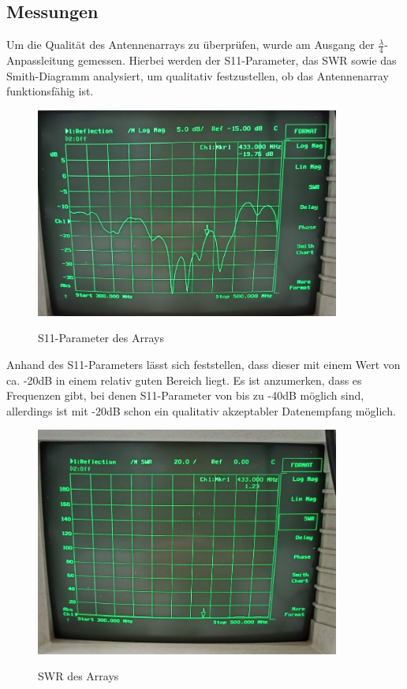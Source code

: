 \subsection{Messungen}
Um die Qualität des Antennenarrays zu überprüfen, wurde am Ausgang der $\frac{\lambda}{4}$-Anpassleitung gemessen. Hierbei werden der S11-Parameter, das SWR sowie das Smith-Diagramm analysiert, um qualitativ festzustellen, ob das Antennenarray funktionsfähig ist.

\begin{figure}[H]
	\centering
	\includegraphics[width=10cm]{../ref/Array-S11.jpg}
	\label{fig:array-S11}
	\caption{S11-Parameter des Arrays}
\end{figure}

Anhand des S11-Parameters lässt sich feststellen, dass dieser mit einem Wert von ca. -20dB in einem relativ guten Bereich liegt. Es ist anzumerken, dass es Frequenzen gibt, bei denen S11-Parameter von bis zu -40dB möglich sind, allerdings ist mit -20dB schon ein qualitativ akzeptabler Datenempfang möglich.

\begin{figure}[H]
	\centering
	\includegraphics[width=10cm]{../ref/Array-SWR.jpg}
	\label{fig:array-SWR}
	\caption{SWR des Arrays}
\end{figure}

